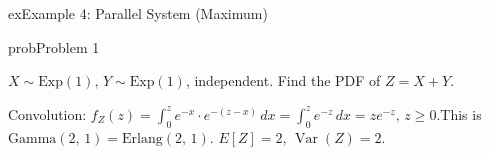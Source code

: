 \begin{PSbox}[unbreakable]{ex}{Example 4: Parallel System (Maximum)}


\begin{Shaded}
\begin{Highlighting}[]
 \OperatorTok{=} \OperatorTok{;}  \OperatorTok{=} \OperatorTok{;}
 \OperatorTok{=} \NormalTok{(}\OperatorTok{/}\OperatorTok{,} \OperatorTok{,} \NormalTok{)}\OperatorTok{;}
 \OperatorTok{=} \NormalTok{(}\OperatorTok{/}\OperatorTok{,} \OperatorTok{,} \NormalTok{)}\OperatorTok{;}
 \OperatorTok{=} \NormalTok{(}\OperatorTok{,} \NormalTok{)}\OperatorTok{;}

\NormalTok{(}\OperatorTok{,} \OperatorTok{/}\NormalTok{)}\OperatorTok{;}
\NormalTok{(}\OperatorTok{,} \OperatorTok{/}\NormalTok{(}\OperatorTok{*}\NormalTok{))}\OperatorTok{;}
\NormalTok{(}\OperatorTok{,} \NormalTok{(}\NormalTok{))}\OperatorTok{;}
\end{Highlighting}
\end{Shaded}

\end{PSbox}


\begin{PSbox}[unbreakable]{prob}{Problem 1}

$X \sim \mathrm{Exp}(1),\, Y \sim \mathrm{Exp}(1)$, independent. Find the PDF of $Z = X + Y$.

\PSsolution{} Convolution: $f_{Z}(z) = \int_{0}^{z} e^{-x} \cdot e^{-(z-x)}\,dx = \int_{0}^{z} e^{-z}\,dx = ze^{-z},\, z \ge 0$.\PSbr{}This is $\mathrm{Gamma}(2,\,1) = \mathrm{Erlang}(2,\,1)$. $E[Z] = 2,\, \operatorname{Var}(Z) = 2$.

\end{PSbox}


